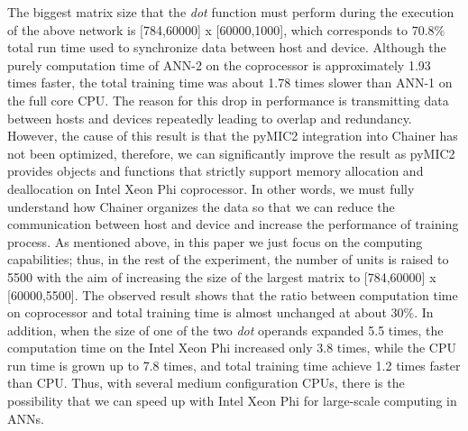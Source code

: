 The biggest matrix size that the \textit{dot} function must perform during the execution of the above network is [784,60000] x [60000,1000], which corresponds to 70.8\% total run time used to synchronize data between host and device. Although the purely computation time of ANN-2 on the coprocessor is approximately 1.93 times faster, the total training time was about 1.78 times slower than ANN-1 on the full core CPU. The reason for this drop in performance is transmitting data between hosts and devices repeatedly leading to overlap and redundancy. However, the cause of this result is that the pyMIC2 integration into Chainer has not been optimized, therefore, we can significantly improve the result as pyMIC2 provides objects and functions that strictly support memory allocation and deallocation on Intel Xeon Phi coprocessor. In other words, we must fully understand how Chainer organizes the data so that we can reduce the communication between host and device and increase the performance of training process. As mentioned above, in this paper we just focus on the computing capabilities; thus, in the rest of the experiment, the number of units is raised to 5500 with the aim of increasing the size of the largest matrix to [784,60000] x [60000,5500]. The observed result shows that the ratio between computation time on coprocessor and total training time is almost unchanged at about 30\%. In addition, when the size of one of the two \textit{dot} operands expanded 5.5 times, the computation time on the Intel Xeon Phi increased only 3.8 times, while the CPU run time is grown up to 7.8 times, and total training time achieve 1.2 times faster than CPU. Thus, with several medium configuration CPUs, there is the possibility that we can speed up with Intel Xeon Phi for large-scale computing in ANNs.
